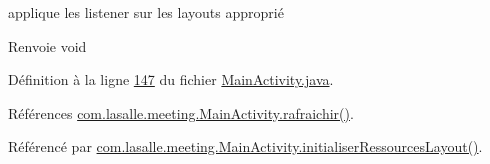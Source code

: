 applique les listener sur les layouts approprié 

\begin{DoxyReturn}{Renvoie}
void 
\end{DoxyReturn}


Définition à la ligne \hyperlink{_main_activity_8java_source_l00147}{147} du fichier \hyperlink{_main_activity_8java_source}{Main\+Activity.\+java}.



Références \hyperlink{_main_activity_8java_source_l00330}{com.\+lasalle.\+meeting.\+Main\+Activity.\+rafraichir()}.



Référencé par \hyperlink{_main_activity_8java_source_l00134}{com.\+lasalle.\+meeting.\+Main\+Activity.\+initialiser\+Ressources\+Layout()}.


